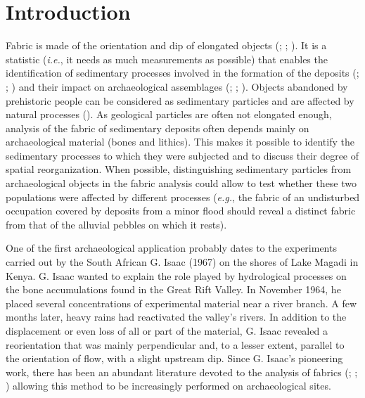 \documentclass[
]{article}
\begin{document}
\section{Introduction}\label{introduction}

Fabric is made of the orientation and dip of elongated objects
(;
;
). It is a statistic
(\emph{i.e.}, it needs as much measurements as possible) that enables
the identification of sedimentary processes involved in the formation of
the deposits (;
;
) and their impact
on archaeological assemblages (;
; ). Objects abandoned by prehistoric people can be considered
as sedimentary particles and are affected by natural processes
(). As geological particles
are often not elongated enough, analysis of the fabric of sedimentary
deposits often depends mainly on archaeological material (bones and
lithics). This makes it possible to identify the sedimentary processes
to which they were subjected and to discuss their degree of spatial
reorganization. When possible, distinguishing sedimentary particles from
archaeological objects in the fabric analysis could allow to test
whether these two populations were affected by different processes
(\emph{e.g.}, the fabric of an undisturbed occupation covered by
deposits from a minor flood should reveal a distinct fabric from that of
the alluvial pebbles on which it rests).

One of the first archaeological application probably dates to the
experiments carried out by the South African G. Isaac (1967) on the
shores of Lake Magadi in Kenya. G. Isaac wanted to explain the role
played by hydrological processes on the bone accumulations found in the
Great Rift Valley. In November 1964, he placed several concentrations of
experimental material near a river branch. A few months later, heavy
rains had reactivated the valley's rivers. In addition to the
displacement or even loss of all or part of the material, G. Isaac
revealed a reorientation that was mainly perpendicular and, to a lesser
extent, parallel to the orientation of flow, with a slight upstream dip.
Since G. Isaac's pioneering work, there has been an abundant literature
devoted to the analysis of fabrics (;
;
) allowing this method
to be increasingly performed on archaeological sites.
\end{document}
